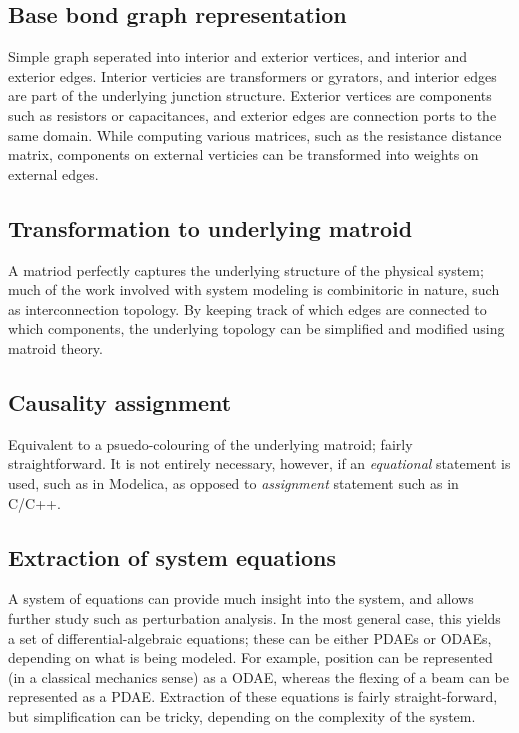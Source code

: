 \documentclass[utf,a4paper,12pt]{report}
\begin{document}
\subsection{Base bond graph representation}
Simple graph seperated into interior and exterior vertices, and interior and exterior edges. Interior verticies are transformers or gyrators, and interior edges are part of the underlying junction structure. Exterior vertices are components such as resistors or capacitances, and exterior edges are connection ports to the same domain. While computing various matrices, such as the resistance distance matrix, components on external verticies can be transformed into weights on external edges.
\subsection{Transformation to underlying matroid}
A matriod perfectly captures the underlying structure of the physical system; much of the work involved with system modeling is combinitoric in nature, such as interconnection topology. By keeping track of which edges are connected to which components, the underlying topology can be simplified and modified using matroid theory.
\subsection{Causality assignment}
Equivalent to a psuedo-colouring of the underlying matroid; fairly straightforward. It is not entirely necessary, however, if an \emph{equational} statement is used, such as in Modelica, as opposed to \emph{assignment} statement such as in C/C++.
\subsection{Extraction of system equations}
A system of equations can provide much insight into the system, and allows further study such as perturbation analysis. In the most general case, this yields a set of differential-algebraic equations; these can be either PDAEs or ODAEs, depending on what is being modeled. For example, position can be represented (in a classical mechanics sense) as a ODAE, whereas the flexing of a beam can be represented as a PDAE. Extraction of these equations is fairly straight-forward, but simplification can be tricky, depending on the complexity of the system.
\end{document}
